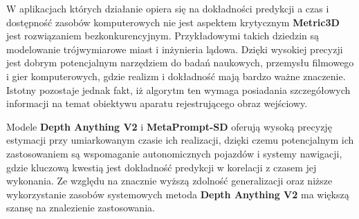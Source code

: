 W aplikacjach których działanie opiera się na dokładności predykcji a czas i dostępność zasobów komputerowych nie jest aspektem krytycznym \textbf{Metric3D} jest rozwiązaniem bezkonkurencyjnym. Przykładowymi takich dziedzin są modelowanie trójwymiarowe miast i inżynieria lądowa. Dzięki wysokiej precyzji jest dobrym potencjalnym narzędziem do badań naukowych, przemysłu filmowego i gier komputerowych, gdzie realizm i dokładność mają bardzo ważne znaczenie. Istotny pozostaje jednak fakt, iż algorytm ten wymaga posiadania szczegółowych informacji na temat obiektywu aparatu rejestrującego obraz wejściowy.

Modele \textbf{Depth Anything V2} i \textbf{MetaPrompt-SD} oferują wysoką precyzję estymacji przy umiarkowanym czasie ich realizacji, dzięki czemu potencjalnym ich zastosowaniem są wspomaganie autonomicznych pojazdów i systemy nawigacji, gdzie kluczową kwestią jest dokładność predykcji w korelacji z czasem jej wykonania. Ze względu na znacznie wyższą zdolność generalizacji oraz niższe wykorzystanie zasobów systemowych metoda \textbf{Depth Anything V2} ma większą szansę na znalezienie zastosowania.